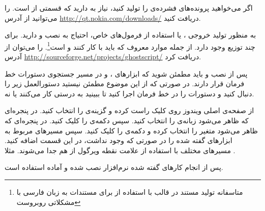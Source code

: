 \begin{sloppypar}
اگر می‌خواهید پرونده‌های فشرده‌ی  را تولید کنید، نیاز به  دارید که قسمتی از  
 است.  را می‌توانید از آدرس 
\url{http://qt.nokia.com/downloads/}
دریافت کنید.
\end{sloppypar}

\begin{sloppypar}
به منظور تولید خروجی ، یا استفاده از فرمول‌های خاص، احتیاج به نصب  و  دارید. 
برای  چند توزیع وجود دارد. از جمله موارد معروف که باید با  کار کنند  و  است\footnote{متاسفانه تولید مستند در قالب  با استفاده از  برای مستندات به زبان فارسی با مشکلاتی روبروست}.
 را می‌توان از آدرس 
\url{http://sourceforge.net/projects/ghostscript/} 
 دریافت کرد.
\end{sloppypar}

پس از نصب  و  باید مطمئن شوید که ابزارهای
،  و  در مسیر جستجوی دستورات خط
فرمان قرار دارند. در صورتی که از این موضوع مطمئن نیستید دستورالعمل زیر را دنبال
کنید و دستورات را در خط فرمان اجرا کنید تا ببینید به درستی کار می‌کنند یا نه.

\begin{sloppypar}
از صفحه‌ی اصلی ویندوز روی  کلیک راست کرده و گزینه‌ی  را انتخاب کنید. 
 در پنجره‌ای که ظاهر می‌شود زبانه‌ی  را انتخاب کنید. سپس دکمه‌ی  را کلیک کنید. 
 در پنجره‌ای که ظاهر می‌شود متغیر  را انتخاب کرده و دکمه‌ی  را کلیک کنید. 
 سپس مسیرهای مربوط به ابزارهای گفته شده را در صورتی که وجود نداشت، در این قسمت اضافه کنید. 
 مسیرهای مختلف با استفاده از علامت نقطه ویرگول از هم جدا می‌شوند. مثلا 
.
\end{sloppypar}

پس از انجام کارهای گفته شده نرم‌افزار  نصب شده و آماده استفاده است.